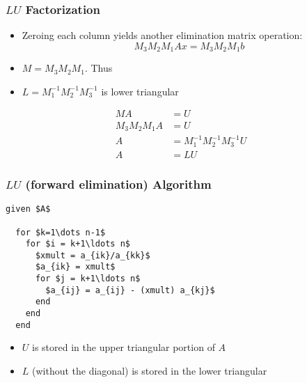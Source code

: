 \documentclass[10pt]{beamer}
\begin{document}
\begin{frame}
\frametitle{$LU$ Factorization}
\begin{itemize}
    \item Zeroing each column yields another elimination matrix operation:
        \[ M_3 M_2 M_1 A x = M_3 M_2 M_1 b \]
    \item $M=M_3 M_2 M_1$.  Thus
    \item $L= M_1^{-1} M_2^{-1} M_3^{-1}$ is lower triangular 
\end{itemize}
\begin{align*}
            M A   & = U      \\
    M_3 M_2 M_1 A & = U     \\
                A & = M_1^{-1} M_2^{-1} M_3^{-1} U \\
                A & = L U
\end{align*}
\end{frame}
\begin{frame}[fragile]
\frametitle{$LU$ (forward elimination) Algorithm}

\begin{lstlisting}[mathescape,caption=$LU$,label=algo:LU]
  given $A$
                               
  for $k=1\dots n-1$          
    for $i = k+1\ldots n$      
      $xmult = a_{ik}/a_{kk}$
      $a_{ik} = xmult$
      for $j = k+1\ldots n$      
        $a_{ij} = a_{ij} - (xmult) a_{kj}$
      end                      
    end                        
  end                          
\end{lstlisting}
\begin{itemize}
    \item $U$ is stored in the upper triangular portion of $A$
    \item $L$ (without the diagonal) is stored in the lower triangular
\end{itemize}
\end{frame}
\end{document}
